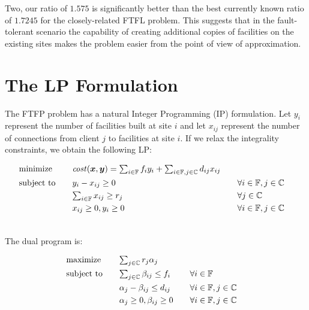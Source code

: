 \documentclass[11pt]{article}
\begin{document}
Two, our ratio of $1.575$ is significantly better than the
best currently known ratio of $1.7245$ for the
closely-related FTFL problem. This suggests that in the
fault-tolerant scenario the capability of creating
additional copies of facilities on the existing sites makes
the problem easier from the point of view of approximation.


\section{The LP Formulation}\label{sec: the lp formulation}

The FTFP problem has a natural Integer Programming (IP)
formulation. Let $y_i$ represent the number of facilities
built at site $i$ and let $x_{ij}$ represent the number of
connections from client $j$ to facilities at site $i$. If we
relax the integrality constraints, we obtain the following LP:


\begin{alignat}{3}
  &\textrm{minimize} &\quad&\textstyle{{\it cost}(\boldsymbol{x},\boldsymbol{y}) = \sum_{i\in \mathbb{F}}f_iy_i 
								+ \sum_{i\in \mathbb{F}, j\in \mathbb{C}}d_{ij}x_{ij}}\label{eqn:fac_primal}
									\\ \notag
  &\textrm{subject to}&& y_i - x_{ij} \geq 0 &\quad& \forall i\in \mathbb{F}, j\in \mathbb{C} 
									\\ \notag
  & &&\textstyle{\sum_{i\in \mathbb{F}} x_{ij} \geq r_j} && \forall j\in \mathbb{C}
 									\\ \notag
  & &&\textstyle{ x_{ij} \geq 0, y_i \geq 0} && \forall i\in \mathbb{F}, j\in \mathbb{C} 
  									\\ \notag
\end{alignat}


\noindent
The dual program is:

\begin{alignat}{3}
  &\textrm{maximize}&\quad& \textstyle{\sum_{j\in \mathbb{C}} r_j\alpha_j}\label{eqn:fac_dual}  
     						\\ \notag
  &\textrm{subject to} && \textstyle{
    \sum_{j\in \mathbb{C}}\beta_{ij} \leq f_i}  &\quad& \forall i \in \mathbb{F}  
							\\ \notag
  & &&\textstyle{\alpha_{j} - \beta_{ij} \leq
    d_{ij}}  && \forall i\in \mathbb{F}, j\in \mathbb{C} 
							\\ \notag
  & &&\textstyle{\alpha_j \geq 0,
    \beta_{ij} \geq 0} && \forall i\in \mathbb{F}, j\in \mathbb{C}
  							\\ \notag
\end{alignat}
\end{document}
